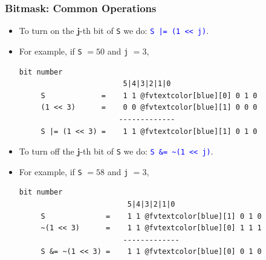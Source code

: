 \documentclass{beamer}
\begin{document}
\begin{frame}[fragile]
\frametitle{Bitmask: Common Operations}

\scriptsize

\begin{itemize}

\item To turn on the $\mathbf{j}$-th bit of \verb+S+ we do: \textcolor{blue}{\texttt{S |= (1 << j)}}.

\vspace{0.1cm}

\item<2-> For example, if \verb+S+ $= 50$ and \verb+j+ $= 3$,

\begin{center}
\begin{Verbatim}[commandchars=@\[\]]
                         bit number
                        5|4|3|2|1|0
     S             =    1 1 @fvtextcolor[blue][0] 0 1 0
     (1 << 3)      =    0 0 @fvtextcolor[blue][1] 0 0 0
                       -------------
     S |= (1 << 3) =    1 1 @fvtextcolor[blue][1] 0 1 0
\end{Verbatim}
\end{center}

\vspace{0.3cm}

\item<3-> To turn off the $\mathbf{j}$-th bit of \verb+S+ we do: \textcolor{blue}{\texttt{S \&= \textasciitilde(1 << j)}}.

\vspace{0.1cm}

\item<4-> For example, if \verb+S+ $= 58$ and \verb+j+ $= 3$,

\begin{center}
\begin{Verbatim}[commandchars=@\[\]]
                          bit number
                         5|4|3|2|1|0
     S              =    1 1 @fvtextcolor[blue][1] 0 1 0
     ~(1 << 3)      =    1 1 @fvtextcolor[blue][0] 1 1 1
                        -------------
     S &= ~(1 << 3) =    1 1 @fvtextcolor[blue][0] 0 1 0
\end{Verbatim}
\end{center}

\end{itemize}

\end{frame}
\end{document}
